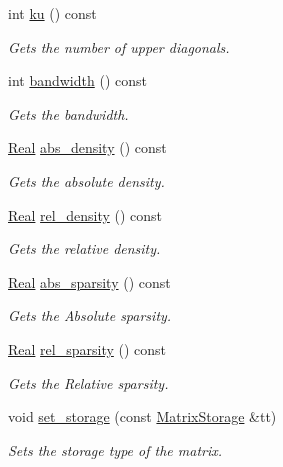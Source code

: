 \begin{DoxyCompactItemize}
int \hyperlink{classmtk_1_1Matrix_ab12a5b97320ca40fbfab970c005ce916}{ku} () const 
\begin{DoxyCompactList}\small\item\em Gets the number of upper diagonals. \end{DoxyCompactList}\item 
int \hyperlink{classmtk_1_1Matrix_a27d963e9cb68fa8f04989ad89a9b3f0a}{bandwidth} () const 
\begin{DoxyCompactList}\small\item\em Gets the bandwidth. \end{DoxyCompactList}\item 
\hyperlink{group__c01-roots_gac080bbbf5cbb5502c9f00405f894857d}{Real} \hyperlink{classmtk_1_1Matrix_a4734aaab88e2fe344231b899ab5a8f56}{abs\-\_\-density} () const 
\begin{DoxyCompactList}\small\item\em Gets the absolute density. \end{DoxyCompactList}\item 
\hyperlink{group__c01-roots_gac080bbbf5cbb5502c9f00405f894857d}{Real} \hyperlink{classmtk_1_1Matrix_a98591f1f394ec84599fb15d9ff53db1a}{rel\-\_\-density} () const 
\begin{DoxyCompactList}\small\item\em Gets the relative density. \end{DoxyCompactList}\item 
\hyperlink{group__c01-roots_gac080bbbf5cbb5502c9f00405f894857d}{Real} \hyperlink{classmtk_1_1Matrix_a20463698d90ddf3ae7d211a2cc441a62}{abs\-\_\-sparsity} () const 
\begin{DoxyCompactList}\small\item\em Gets the Absolute sparsity. \end{DoxyCompactList}\item 
\hyperlink{group__c01-roots_gac080bbbf5cbb5502c9f00405f894857d}{Real} \hyperlink{classmtk_1_1Matrix_ad7e4650598ce4d99a130f64892fc33b9}{rel\-\_\-sparsity} () const 
\begin{DoxyCompactList}\small\item\em Gets the Relative sparsity. \end{DoxyCompactList}\item 
void \hyperlink{classmtk_1_1Matrix_ac0edd0ee07853d0ef6dea9b08d15e132}{set\-\_\-storage} (const \hyperlink{group__c02-enums_ga25b67ec6a2afeee69f9bb196a9c66619}{Matrix\-Storage} \&tt)
\begin{DoxyCompactList}\small\item\em Sets the storage type of the matrix. \end{DoxyCompactList}\item 

\end{DoxyCompactItemize}
